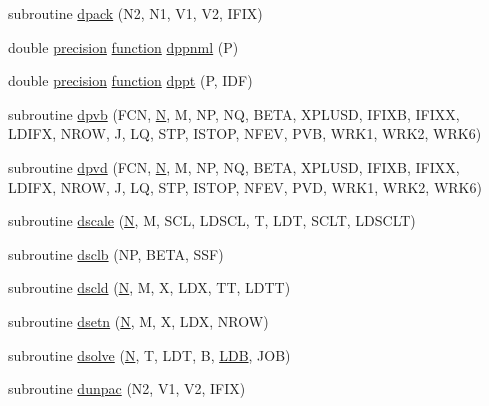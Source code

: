\begin{DoxyCompactItemize}
\item 
subroutine \hyperlink{d__odr_8f_a72db0048a4c3dfc0ae65df07c8e8f1dc}{dpack} (N2, N1, V1, V2, I\+F\+I\+X)
\item 
double \hyperlink{numinquire_8h_a2c8e616467665d0b2814d4c1589ba74e}{precision} \hyperlink{afunc_8m_a7b5e596df91eadea6c537c0825e894a7}{function} \hyperlink{d__odr_8f_ade29643bf7c7af3aa06d1777a83e9ec8}{dppnml} (P)
\item 
double \hyperlink{numinquire_8h_a2c8e616467665d0b2814d4c1589ba74e}{precision} \hyperlink{afunc_8m_a7b5e596df91eadea6c537c0825e894a7}{function} \hyperlink{d__odr_8f_a2df5c9f70b71e0b1de6172a4c13a20b2}{dppt} (P, I\+D\+F)
\item 
subroutine \hyperlink{d__odr_8f_ab18109215cc9903bfa3bcb3acb57a1b0}{dpvb} (F\+C\+N, \hyperlink{polmisc_8c_a0240ac851181b84ac374872dc5434ee4}{N}, M, N\+P, N\+Q, B\+E\+T\+A, X\+P\+L\+U\+S\+D, I\+F\+I\+X\+B, I\+F\+I\+X\+X, L\+D\+I\+F\+X, N\+R\+O\+W, J, L\+Q, S\+T\+P, I\+S\+T\+O\+P, N\+F\+E\+V, P\+V\+B, W\+R\+K1, W\+R\+K2, W\+R\+K6)
\item 
subroutine \hyperlink{d__odr_8f_ab6f10ab1dd50271f0504516f5e0469db}{dpvd} (F\+C\+N, \hyperlink{polmisc_8c_a0240ac851181b84ac374872dc5434ee4}{N}, M, N\+P, N\+Q, B\+E\+T\+A, X\+P\+L\+U\+S\+D, I\+F\+I\+X\+B, I\+F\+I\+X\+X, L\+D\+I\+F\+X, N\+R\+O\+W, J, L\+Q, S\+T\+P, I\+S\+T\+O\+P, N\+F\+E\+V, P\+V\+D, W\+R\+K1, W\+R\+K2, W\+R\+K6)
\item 
subroutine \hyperlink{d__odr_8f_a5a8c259bb0990dbc7711d6f82156d6c6}{dscale} (\hyperlink{polmisc_8c_a0240ac851181b84ac374872dc5434ee4}{N}, M, S\+C\+L, L\+D\+S\+C\+L, T, L\+D\+T, S\+C\+L\+T, L\+D\+S\+C\+L\+T)
\item 
subroutine \hyperlink{d__odr_8f_a16d40e34519f6f9409d4df1d8670c74d}{dsclb} (N\+P, B\+E\+T\+A, S\+S\+F)
\item 
subroutine \hyperlink{d__odr_8f_a9bb7c05c28a13f17f2400a46802306b8}{dscld} (\hyperlink{polmisc_8c_a0240ac851181b84ac374872dc5434ee4}{N}, M, X, L\+D\+X, T\+T, L\+D\+T\+T)
\item 
subroutine \hyperlink{d__odr_8f_a984e544c7c5a91757f33d37c201ced3d}{dsetn} (\hyperlink{polmisc_8c_a0240ac851181b84ac374872dc5434ee4}{N}, M, X, L\+D\+X, N\+R\+O\+W)
\item 
subroutine \hyperlink{d__odr_8f_adf6da22af06601fc7ba6caea135e7733}{dsolve} (\hyperlink{polmisc_8c_a0240ac851181b84ac374872dc5434ee4}{N}, T, L\+D\+T, B, \hyperlink{example__user_8c_a50e90a7104df172b5a89a06c47fcca04}{L\+D\+B}, J\+O\+B)
\item 
subroutine \hyperlink{d__odr_8f_af0b53429d01c5d3b633eef12984d2041}{dunpac} (N2, V1, V2, I\+F\+I\+X)

\end{DoxyCompactItemize}
